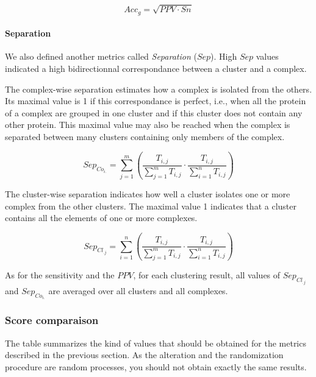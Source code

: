 \[Acc_g = \sqrt{PPV \cdot Sn}\]

\paragraph{Separation}

We also defined another metrics called \textit{Separation} ($Sep$). High $Sep$ values indicated a high bidirectionnal correspondance between a cluster and a complex.

The complex-wise separation estimates how a complex is isolated from the others. Its maximal value is 1 if this correspondance is perfect, i.e., when all the protein of a complex are grouped in one cluster and if this cluster does not contain any other protein. This maximal value may also be reached when the complex is separated between many clusters containing only members of the complex.

\[Sep_{Co_{i.}} = \sum_{j=1}^{m}{(\frac{T_{i,j}}{\sum_{j=1}^{m}{T_{i,j}}} \cdot \frac{T_{i,j}}{\sum_{i=1}^{n}{T_{i,j}}})}\]

The cluster-wise separation indicates how well a cluster isolates one or more complex from the other clusters. The maximal value 1 indicates that a cluster contains all the elements of one or more complexes.  

\[Sep_{Cl_{.j}} = \sum_{i=1}^{n}{(\frac{T_{i,j}}{\sum_{j=1}^{m}{T_{i,j}}} \cdot \frac{T_{i,j}}{\sum_{i=1}^{n}{T_{i,j}}})}\]

As for the sensitivity and the $PPV$, for each clustering result, all values of $Sep_{Cl_{.j}}$ and $Sep_{Co_{i.}}$ are averaged over all clusters and all complexes.

\subsubsection{Score comparaison}

The table summarizes the kind of values that should be obtained for the metrics described in the previous section. As the alteration and the randomization procedure are random processes, you should not obtain exactly the same results.

